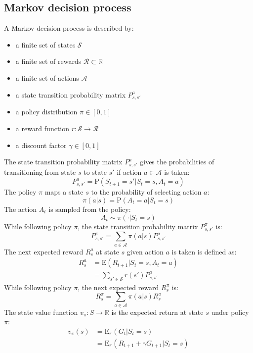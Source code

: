 \documentclass{article}
\begin{document}
\subsection{Markov decision process}
A Markov decision process is described by:
\begin{itemize}    
    \item a finite set of states $ \mathcal{S} $
    \item a finite set of rewards $ \mathcal{R} \subset \mathbb{R} $
    \item a finite set of actions $ \mathcal{A} $
    \item a state transition probability matrix $ P_{s,s'}^a $
    \item a policy distribution $ \pi \in [0,1] $
    \item a reward function $r: \mathcal{S} \to \mathcal{R} $
    \item a discount factor $ \gamma \in [0, 1] $
\end{itemize}
The state transition probability matrix $ P_{s,s'}^a $ gives the probabilities of transitioning from state $ s $ to state $ s' $ if action $ a \in \mathcal{A} $ is taken:
\[ P_{s,s'}^a = \text{P}(S_{t+1} = s' | S_t = s, A_t = a) \]
The policy $ \pi $ maps a state $ s $ to the probability of selecting action $ a $:
\[ \pi(a | s) = \text{P}(A_t = a | S_t = s) \]
The action $ A_t $ is sampled from the policy:
\[ A_t \sim \pi( \cdot | S_t = s) \]
While following policy $ \pi $, the state transition probability matrix $ P_{s,s'}^{\pi} $ is:
\[ P_{s,s'}^{\pi} = \sum_{a \in \mathcal{A}} \pi(a | s) P_{s,s'}^a \]
The next expected reward $ R_s^a $ at state $ s $ given action $ a $ is taken is defined as:
\begin{equation*}
\begin{split}
R_s^a & = \text{E}(R_{t+1} | S_t = s, A_t = a) \\
 & = \sum_{s' \in \mathcal{S}} r(s') P_{s,s'}^a
\end{split}
\end{equation*}
While following policy $ \pi $, the next expected reward $ R_s^{\pi} $ is:
\[ R_s^{\pi} = \sum_{a \in \mathcal{A}} \pi(a | s) R_s^a \]
The state value function $ v_{\pi}: S \to \mathbb{R} $ is the expected return at state $ s $ under policy $ \pi $:
\begin{equation*}
\begin{split}
v_{\pi}(s) & = \text{E}_{\pi}(G_t | S_t = s) \\
 & = \text{E}_{\pi}(R_{t+1} + \gamma G_{t+1} | S_t = s)
\end{split}
\end{equation*}
\end{document}
